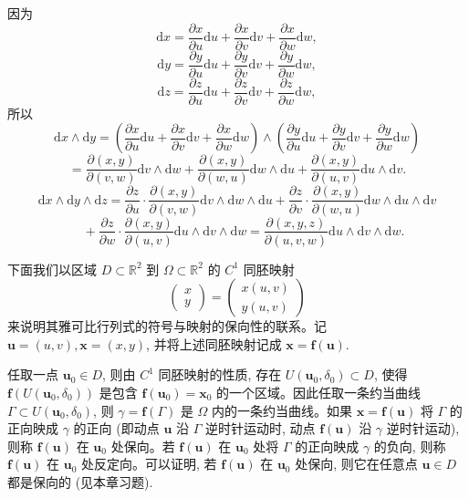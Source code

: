 \begin{solve}
因为
\[
  \mathrm dx=\frac{\partial x}{\partial u}\mathrm du+\frac{\partial x}{\partial v}\mathrm dv+\frac{\partial x}{\partial w}\mathrm dw,
\]
\[
  \mathrm dy=\frac{\partial y}{\partial u}\mathrm du+\frac{\partial y}{\partial v}\mathrm dv+\frac{\partial y}{\partial w}\mathrm dw,
\]
\[
  \mathrm dz=\frac{\partial z}{\partial u}\mathrm du+\frac{\partial z}{\partial v}\mathrm dv+\frac{\partial z}{\partial w}\mathrm dw,
\]
所以
\[
  \mathrm dx\wedge\mathrm dy
  =\left(\frac{\partial x}{\partial u}\mathrm du+\frac{\partial x}{\partial v}\mathrm dv+\frac{\partial x}{\partial w}\mathrm dw\right)
  \wedge
  \left(\frac{\partial y}{\partial u}\mathrm du+\frac{\partial y}{\partial v}\mathrm dv+\frac{\partial y}{\partial w}\mathrm dw\right)
\]
\[
  =\frac{\partial(x,y)}{\partial(v,w)}\mathrm dv\wedge\mathrm dw
  +\frac{\partial(x,y)}{\partial(w,u)}\mathrm dw\wedge\mathrm du
  +\frac{\partial(x,y)}{\partial(u,v)}\mathrm du\wedge\mathrm dv.
\]
\[
  \mathrm dx\wedge\mathrm dy\wedge\mathrm dz
  =\frac{\partial z}{\partial u}\cdot\frac{\partial(x,y)}{\partial(v,w)}
  \mathrm dv\wedge\mathrm dw\wedge\mathrm du
  +\frac{\partial z}{\partial v}\cdot\frac{\partial(x,y)}{\partial(w,u)}
  \mathrm dw\wedge\mathrm du\wedge\mathrm dv
\]
\[
  \quad+\frac{\partial z}{\partial w}\cdot\frac{\partial(x,y)}{\partial(u,v)}
  \mathrm du\wedge\mathrm dv\wedge\mathrm dw
  =\frac{\partial(x,y,z)}{\partial(u,v,w)}\mathrm du\wedge\mathrm dv\wedge\mathrm dw.
\]

下面我们以区域 $D\subset\mathbb R^2$ 到 $\Omega\subset\mathbb R^2$ 的 $C^1$ 同胚映射
\[
  \begin{pmatrix}x\\y\end{pmatrix}
  =
  \begin{pmatrix}x(u,v)\\y(u,v)\end{pmatrix}
\]
来说明其雅可比行列式的符号与映射的保向性的联系。记 $\boldsymbol u=(u,v),\boldsymbol x=(x,y)$, 并将上述同胚映射记成 $\boldsymbol x=\boldsymbol f(\boldsymbol u)$.

任取一点 $\boldsymbol u_0\in D$, 则由 $C^1$ 同胚映射的性质, 存在 $U(\boldsymbol u_0,\delta_0)\subset D$, 使得 $\boldsymbol f(U(\boldsymbol u_0,\delta_0))$ 是包含 $\boldsymbol f(\boldsymbol u_0)=\boldsymbol x_0$ 的一个区域。因此任取一条约当曲线 $\Gamma\subset U(\boldsymbol u_0,\delta_0)$, 则 $\gamma=\boldsymbol f(\Gamma)$ 是 $\Omega$ 内的一条约当曲线。如果 $\boldsymbol x=\boldsymbol f(\boldsymbol u)$ 将 $\Gamma$ 的正向映成 $\gamma$ 的正向 (即动点 $\boldsymbol u$ 沿 $\Gamma$ 逆时针运动时, 动点 $\boldsymbol f(\boldsymbol u)$ 沿 $\gamma$ 逆时针运动), 则称 $\boldsymbol f(\boldsymbol u)$ 在 $\boldsymbol u_0$ 处保向。若 $\boldsymbol f(\boldsymbol u)$ 在 $\boldsymbol u_0$ 处将 $\Gamma$ 的正向映成 $\gamma$ 的负向, 则称 $\boldsymbol f(\boldsymbol u)$ 在 $\boldsymbol u_0$ 处反定向。可以证明, 若 $\boldsymbol f(\boldsymbol u)$ 在 $\boldsymbol u_0$ 处保向, 则它在任意点 $\boldsymbol u\in D$ 都是保向的 (见本章习题).


\end{solve}
